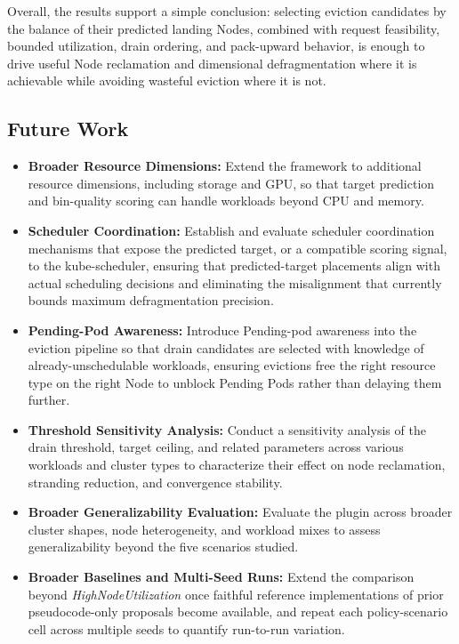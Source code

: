 Overall, the results support a simple conclusion: selecting eviction candidates by the balance of their predicted landing Nodes, combined with request feasibility, bounded utilization, drain ordering, and pack-upward behavior, is enough to drive useful Node reclamation and dimensional defragmentation where it is achievable while avoiding wasteful eviction where it is not.

\subsection{Future Work}
\label{sec:future_works}

\begin{itemize}
    \item \textbf{Broader Resource Dimensions:} Extend the framework to additional resource dimensions, including storage and GPU, so that target prediction and bin-quality scoring can handle workloads beyond CPU and memory.
    \item \textbf{Scheduler Coordination:} Establish and evaluate scheduler coordination mechanisms that expose the predicted target, or a compatible scoring signal, to the kube-scheduler, ensuring that predicted-target placements align with actual scheduling decisions and eliminating the misalignment that currently bounds maximum defragmentation precision.
    \item \textbf{Pending-Pod Awareness:} Introduce Pending-pod awareness into the eviction pipeline so that drain candidates are selected with knowledge of already-unschedulable workloads, ensuring evictions free the right resource type on the right Node to unblock Pending Pods rather than delaying them further.
    \item \textbf{Threshold Sensitivity Analysis:} Conduct a sensitivity analysis of the drain threshold, target ceiling, and related parameters across various workloads and cluster types to characterize their effect on node reclamation, stranding reduction, and convergence stability.
    \item \textbf{Broader Generalizability Evaluation:} Evaluate the plugin across broader cluster shapes, node heterogeneity, and workload mixes to assess generalizability beyond the five scenarios studied.
    \item \textbf{Broader Baselines and Multi-Seed Runs:} Extend the comparison beyond \textit{HighNodeUtilization} once faithful reference implementations of prior pseudocode-only proposals become available, and repeat each policy-scenario cell across multiple seeds to quantify run-to-run variation.
\end{itemize}

